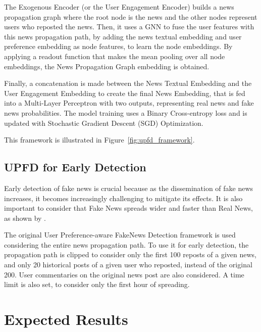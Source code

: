 \documentclass[12pt]{article}
\begin{document}
The Exogenous Encoder (or the User Engagement Encoder) builds a news propagation graph 
where the root node is the news and the other nodes represent users who reposted the news.
Then, it uses a GNN to fuse the user features with this news propagation path, 
by adding the news textual embedding and user preference embedding as node features, 
to learn the node embeddings. 
By applying a readout function that makes the mean pooling over all node embeddings, 
the News Propagation Graph embedding is obtained.

Finally, a concatenation is made between the News Textual Embedding and the User Engagement Embedding
to create the final News Embedding, that is fed into a Multi-Layer Perceptron with two outputs, representing
real news and fake news probabilities. 
The model training uses a Binary Cross-entropy loss and is updated with Stochastic Gradient Descent (SGD) Optimization.

This framework is illustrated in Figure~\ref{fig:upfd_framework}. 

\subsection{UPFD for Early Detection}

Early detection of fake news is crucial because as the dissemination of fake news increases, 
it becomes increasingly challenging to mitigate its effects. It is also important to consider that
Fake News spreads wider and faster than Real News, as shown by \cite{doi:10.1126/science.aap9559}.

The original User Preference-aware FakeNews Detection framework is used 
considering the entire news propagation path. 
To use it for early detection, the propagation path is clipped to consider only
the first 100 reposts of a given news, and only 20 historical posts of a given user who reposted, 
instead of the original 200. 
User commentaries on the original news post are also considered.
A time limit is also set, to consider only the first hour of spreading.

\section{Expected Results}
\end{document}
